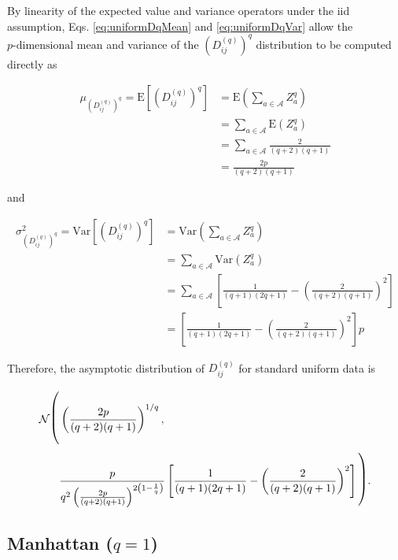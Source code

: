\documentclass[10pt,letterpaper]{article}\usepackage[]{graphicx}\usepackage[]{color}
\begin{document}
By linearity of the expected value and variance operators under the iid assumption, Eqs. \ref{eq:uniformDqMean} and \ref{eq:uniformDqVar} allow the $p \text{-dimensional}$ mean and variance of the $\left(D^{(q)}_{ij}\right)^q$ distribution to be computed directly as

\begin{equation}\label{eq:uniformDqMean}
\begin{split}
\mu_{\left(D^{(q)}_{ij}\right)^q} = \text{E}\left[\left(D^{(q)}_{ij}\right)^q\right] &= \text{E}\left(\sum_{a \in \mathcal{A}}Z^q_a\right) \\
&= \sum_{a \in \mathcal{A}} \text{E}(Z^q_a) \\
&= \sum_{a \in \mathcal{A}} \frac{2}{(q + 2)(q + 1)} \\
&= \frac{2p}{(q + 2)(q + 1)}
\end{split}
\end{equation}

\noindent and

\begin{equation}\label{eq:uniformDqVar}
\begin{split}
\sigma^2_{\left(D^{(q)}_{ij}\right)^q} = \text{Var}\left[\left(D^{(q)}_{ij}\right)^q\right] &= \text{Var}\left(\sum_{a \in \mathcal{A}} Z^q_a\right) \\
&= \sum_{a \in \mathcal{A}} \text{Var}\left(Z^q_a\right) \\
&= \sum_{a \in \mathcal{A}} \left[\frac{1}{(q + 1)(2q + 1)} - \left(\frac{2}{(q + 2)(q + 1)}\right)^2\right] \\
&= \left[\frac{1}{(q + 1)(2q + 1)} - \left(\frac{2}{(q + 2)(q + 1)}\right)^2\right]p
\end{split}
\end{equation}

Therefore, the asymptotic distribution of $D^{(q)}_{ij}$ for standard uniform data is

\begin{equation}\label{eq:uniformDistr}
\begin{split}
\mathcal{N}{\text{\LARGE $\Biggl($}}& \left(\frac{2p}{(q + 2)(q + 1)}\right)^{1/q}, \\
& \frac{p}{q^2\left(\frac{2p}{(q + 2)(q + 1)}\right)^{2\left(1 - \frac{1}{q}\right)}}\left[\frac{1}{(q + 1)(2q + 1)} - \left(\frac{2}{(q + 2)(q + 1)}\right)^2\right]{\text{\LARGE $\Biggr)$}}.
\end{split}
\end{equation}

\subsection{Manhattan \texorpdfstring{($q=1$)}{}}
\end{document}
